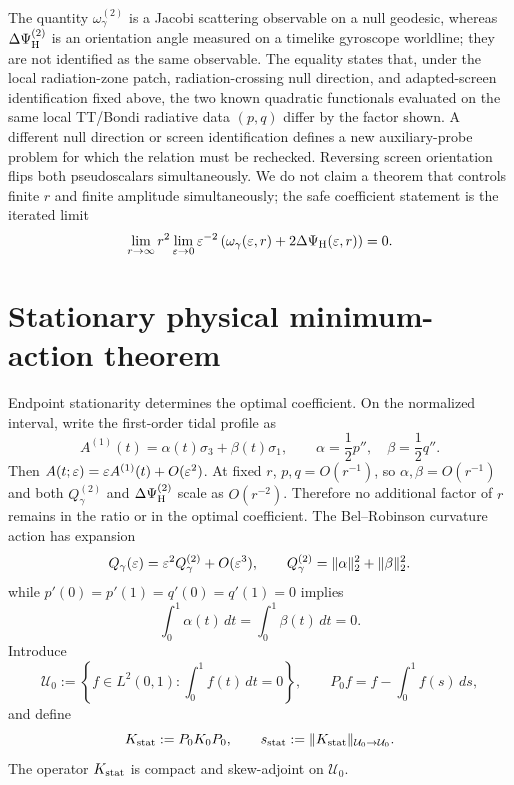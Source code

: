 The quantity $\omega_\gamma^{(2)}$ is a Jacobi scattering observable on a null geodesic, whereas $\Delta\Psi_{\rm H}^{(2)}$ is an orientation angle measured on a timelike gyroscope worldline; they are not identified as the same observable. The equality states that, under the local radiation-zone patch, radiation-crossing null direction, and adapted-screen identification fixed above, the two known quadratic functionals evaluated on the same local TT/Bondi radiative data $(p,q)$ differ by the factor shown. A different null direction or screen identification defines a new auxiliary-probe problem for which the relation must be rechecked. Reversing screen orientation flips both pseudoscalars simultaneously. We do not claim a theorem that controls finite $r$ and finite amplitude simultaneously; the safe coefficient statement is the iterated limit
\begin{equation}
\lim_{r\to\infty}r^2\lim_{\varepsilon\to0}\varepsilon^{-2}
\left(\omega_\gamma(\varepsilon,r)+2\Delta\Psi_{\rm H}(\varepsilon,r)\right)=0.
\label{eq:iterated-limit}
\end{equation}

\section{Stationary physical minimum-action theorem}
Endpoint stationarity determines the optimal coefficient. On the normalized interval, write the first-order tidal profile as
\[
A^{(1)}(t)=\alpha(t)\sigma_3+\beta(t)\sigma_1,\qquad
\alpha=\frac12p'',\quad \beta=\frac12q''.
\]
Then $A(t;\varepsilon)=\varepsilon A^{(1)}(t)+O(\varepsilon^2)$. At fixed $r$, $p,q=O(r^{-1})$, so $\alpha,\beta=O(r^{-1})$ and both $Q_\gamma^{(2)}$ and $\Delta\Psi_{\rm H}^{(2)}$ scale as $O(r^{-2})$. Therefore no additional factor of $r$ remains in the ratio or in the optimal coefficient. The Bel--Robinson curvature action has expansion
\begin{equation}
Q_\gamma(\varepsilon)=\varepsilon^2Q_\gamma^{(2)}+O(\varepsilon^3),\qquad
Q_\gamma^{(2)}=\|\alpha\|_2^2+\|\beta\|_2^2.
\label{eq:Q-leading}
\end{equation}
while $p'(0)=p'(1)=q'(0)=q'(1)=0$ implies
\begin{equation}
\int_0^1\alpha(t)\,dt=\int_0^1\beta(t)\,dt=0.
\label{eq:mean-zero}
\end{equation}
Introduce
\begin{equation}
\mathcal U_0:=\left\{f\in L^2(0,1):\int_0^1 f(t)\,dt=0\right\},\qquad
P_0f=f-\int_0^1f(s)\,ds,
\label{eq:U0}
\end{equation}
and define
\begin{equation}
K_{\rm stat}:=P_0K_0P_0,
\qquad
s_{\rm stat}:=\|K_{\rm stat}\|_{\mathcal U_0\to\mathcal U_0}.
\label{eq:Kstat}
\end{equation}
The operator $K_{\rm stat}$ is compact and skew-adjoint on $\mathcal U_0$.


